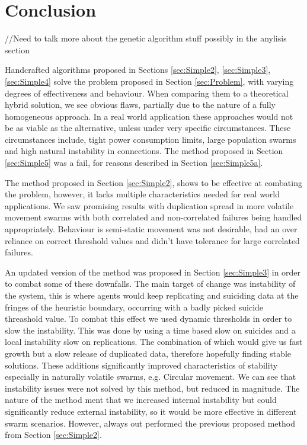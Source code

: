 \documentclass{UoYCSproject}
\begin{document}
\section{Conclusion}
\label{sec:conc}

//Need to talk more about the genetic algorithm stuff possibly in the anylisis section

Handcrafted algorithms proposed in Sections \ref{sec:Simple2}, \ref{sec:Simple3}, \ref{sec:Simple4} solve the problem proposed in Section \ref{sec:Problem}, with varying degrees of effectiveness and behaviour. 
When comparing them to a theoretical hybrid solution, we see obvious flaws, partially due to the nature of a fully homogeneous approach. 
In a real world application these approaches would not be as viable as the alternative, unless under very specific circumstances. 
These circumstances include, tight power consumption limits, large population swarms and high natural instability in connections. 
The method proposed in Section \ref{sec:Simple5} was a fail, for reasons described in Section \ref{sec:Simple5a}.

The method proposed in Section \ref{sec:Simple2}, shows to be effective at combating the problem, however, it lacks multiple characteristics needed for real world applications. 
We saw promising results with duplication spread in more volatile movement swarms with both correlated and non-correlated failures being handled appropriately. 
Behaviour is semi-static movement was not desirable, had an over reliance on correct threshold values and didn’t have tolerance for large correlated failures.

An updated version of the method was proposed in Section \ref{sec:Simple3} in order to combat some of these downfalls. 
The main target of change was instability of the system, this is where agents would keep replicating and suiciding data at the fringes of the heuristic boundary, occurring with a badly picked suicide threashold value. 
To combat this effect we used dynamic thresholds in order to slow the instability. 
This was done by using a time based slow on suicides and a local instability slow on replications. 
The combination of which would give us fast growth but a slow release of duplicated data, therefore hopefully finding stable solutions. 
These additions significantly improved characteristics of stability especially in naturally volatile swarms, e.g. Circular movement. 
We can see that instability issues were not solved by this method, but reduced in magnitude. 
The nature of the method ment that we increased internal instability but could significantly reduce external instability, so it would be more effective in different swarm scenarios. 
However, always out performed the previous proposed method from Section \ref{sec:Simple2}.
\end{document}
